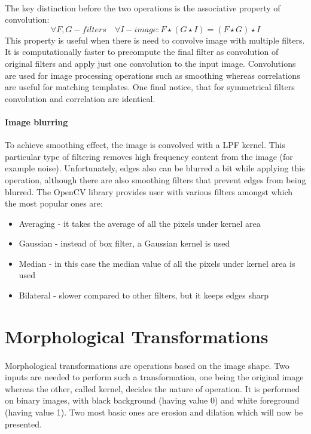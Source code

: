 \paragraph{}
The key distinction before the two operations is the associative property of convolution:
\begin{equation}
	\forall F, G - filters \quad \forall I - image: F \star (G \star I) = (F \star G) \star I
\end{equation}
This property is useful when there is need to convolve image with multiple filters. It is computationally faster to precompute the final filter as convolution of original filters and apply just one convolution to the input image. Convolutions are used for image processing operations such as smoothing whereas correlations are useful for matching templates.
One final notice, that for symmetrical filters convolution and correlation are identical.

\paragraph{Image blurring}
To achieve smoothing effect, the image is convolved with a LPF kernel. This particular type of filtering removes high frequency content from the image (for example noise). Unfortunately, edges also can be blurred a bit while applying this operation, although there are also smoothing filters that prevent edges from being blurred. The OpenCV library provides user with various filters amongst which the most popular ones are:
\begin{itemize}
	\item Averaging - it takes the average of all the pixels under kernel area
	\item Gaussian - instead of box filter, a Gaussian kernel is used
	\item Median - in this case the median value of all the pixels under kernel area is used
	\item Bilateral - slower compared to other filters, but it keeps edges sharp
\end{itemize}

\section{Morphological Transformations}
\paragraph{}
Morphological transformations are operations based on the image shape. Two inputs are needed to perform such a transformation, one being the original image whereas the other, called kernel, decides the nature of operation. It is performed on binary images, with black background (having value 0) and white foreground (having value 1). Two most basic ones are erosion and dilation which will now be presented.

